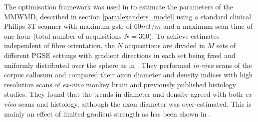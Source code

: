 The optimisation framework was used in \citet{Alexander:2010} to estimate the parameters of the \gls{MMWMD}, described in section \ref{par:alexanders_model} using a standard clinical Philips 3T scanner with maximum {\gls{gstr}} of $60mT/m$ and a maximum scan time of one hour (total number of acquisitions $N=360$). To achieve estimates independent of fibre orientation, the $N$ acquisitions are divided in $M$ sets of different PGSE settings with gradient directions in each set being fixed and uniformly distributed over the sphere as in \cite{Cook:2007}. They performed \emph{in-vivo} scans of the corpus callosum and compared their axon diameter and density indices with high resolution scans of \emph{ex-vivo} monkey brain and previously published histology studies. They found that the trends in diameter and density agreed with both \emph{ex-vivo} scans and histology, although the axon diameter was over-estimated. This is mainly an effect of limited gradient strength as has been shown in \cite{Dyrby:2010}.  


